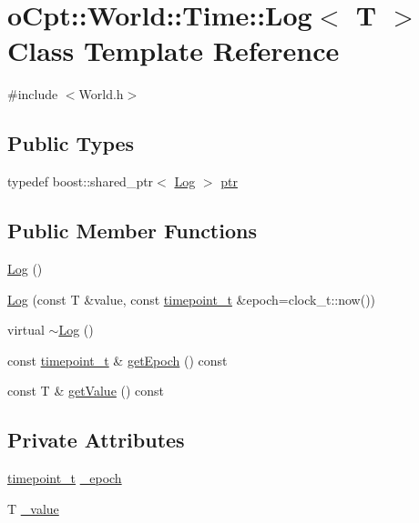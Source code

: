 \hypertarget{classo_cpt_1_1_world_1_1_time_1_1_log}{}\section{o\+Cpt\+:\+:World\+:\+:Time\+:\+:Log$<$ T $>$ Class Template Reference}
\label{classo_cpt_1_1_world_1_1_time_1_1_log}


{\ttfamily \#include $<$World.\+h$>$}

\subsection*{Public Types}
\begin{DoxyCompactItemize}
\item 
typedef boost\+::shared\+\_\+ptr$<$ \hyperlink{classo_cpt_1_1_world_1_1_time_1_1_log}{Log} $>$ \hyperlink{classo_cpt_1_1_world_1_1_time_1_1_log_ac60728a183e1d17aa602cdc78fe2a6f5}{ptr}
\end{DoxyCompactItemize}
\subsection*{Public Member Functions}
\begin{DoxyCompactItemize}
\item 
\hyperlink{classo_cpt_1_1_world_1_1_time_1_1_log_ac4bd19f2963c6f708a7578e4c23bf1d4}{Log} ()
\item 
\hyperlink{classo_cpt_1_1_world_1_1_time_1_1_log_aa404e83afcd8ab1f52d58cf4fb8c8972}{Log} (const T \&value, const \hyperlink{classo_cpt_1_1_world_1_1_time_a6a6e782c3c90622c1c7070b0a223ec4c}{timepoint\+\_\+t} \&epoch=clock\+\_\+t\+::now())
\item 
virtual \hyperlink{classo_cpt_1_1_world_1_1_time_1_1_log_a842b91ce3d76d1a4e0a95831944baca5}{$\sim$\+Log} ()
\item 
const \hyperlink{classo_cpt_1_1_world_1_1_time_a6a6e782c3c90622c1c7070b0a223ec4c}{timepoint\+\_\+t} \& \hyperlink{classo_cpt_1_1_world_1_1_time_1_1_log_abf0caaa0f48e2316200cad9d3dff46bc}{get\+Epoch} () const
\item 
const T \& \hyperlink{classo_cpt_1_1_world_1_1_time_1_1_log_a6ac8d303676d960e53c3ff2e39811cc3}{get\+Value} () const
\end{DoxyCompactItemize}
\subsection*{Private Attributes}
\begin{DoxyCompactItemize}
\item 
\hyperlink{classo_cpt_1_1_world_1_1_time_a6a6e782c3c90622c1c7070b0a223ec4c}{timepoint\+\_\+t} \hyperlink{classo_cpt_1_1_world_1_1_time_1_1_log_a122e3702f277b998131f433829d1b67b}{\+\_\+epoch}
\item 
T \hyperlink{classo_cpt_1_1_world_1_1_time_1_1_log_a63eb942576004d0b6ff7b1cbea7deb9c}{\+\_\+value}
\end{DoxyCompactItemize}


